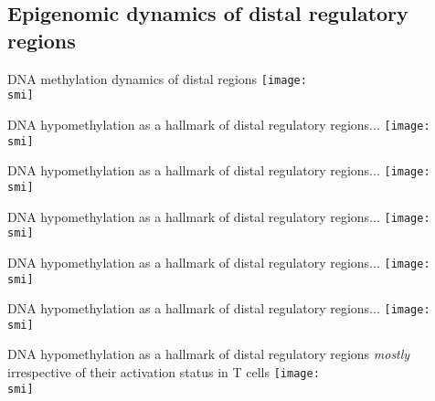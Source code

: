 \documentclass[10pt]{beamer}
\def\smi{out/ln/updir/mw-gcthesis-oral/library.bib}
\begin{document}
\subsection{Epigenomic dynamics of distal regulatory regions}
\begin{frame}{DNA methylation dynamics of distal regions}
  \def\smi{out/ln/updir/mw-gcthesis-oral/ink/hypometh-clusters/1.pdf}
  \texttt{[image: \\smi]}
\end{frame}
\begin{frame}{DNA hypomethylation as a hallmark of distal regulatory regions...}
  \def\smi{out/ln/updir/mw-gcthesis-oral/ink/hypometh-clusters/2.pdf}
  \texttt{[image: \\smi]}%
\end{frame}
\begin{frame}{DNA hypomethylation as a hallmark of distal regulatory regions...}
  \def\smi{out/ln/updir/mw-gcthesis-oral/ink/hypometh-clusters/3.pdf}
  \texttt{[image: \\smi]}
\end{frame}
\begin{frame}{DNA hypomethylation as a hallmark of distal regulatory regions...}
  \def\smi{out/ln/updir/mw-gcthesis-oral/ink/hypometh-clusters/4.pdf}
  \texttt{[image: \\smi]}%
\end{frame}
\begin{frame}{DNA hypomethylation as a hallmark of distal regulatory regions...}
  \def\smi{out/ln/updir/mw-gcthesis-oral/ink/hypometh-clusters/5.pdf}
  \texttt{[image: \\smi]}
\end{frame}
\begin{frame}{DNA hypomethylation as a hallmark of distal regulatory regions...}
  \def\smi{out/ln/updir/mw-gcthesis-oral/ink/hypometh-clusters/6.pdf}
  \texttt{[image: \\smi]}
\end{frame}
\begin{frame}{DNA hypomethylation as a hallmark of distal regulatory regions \emph{mostly} irrespective of their activation status in T cells}
  \def\smi{out/ln/updir/mw-gcthesis-oral/ink/h3k27ac-clusters/1.pdf}
  \texttt{[image: \\smi]}%
\end{frame}
\end{document}
